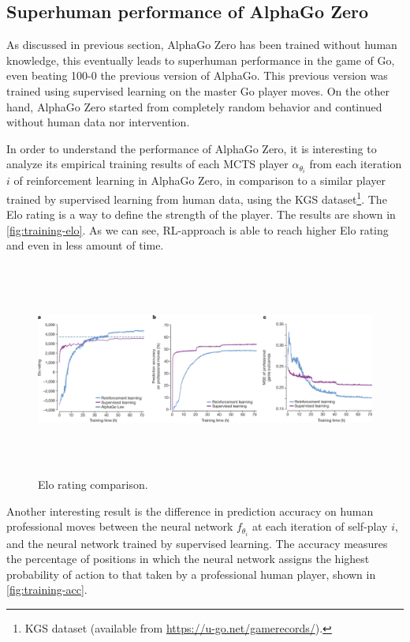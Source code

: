 \documentclass{article}
\begin{document}
\subsection{Superhuman performance of AlphaGo Zero}
As discussed in previous section, AlphaGo Zero has been trained without human knowledge, this eventually leads to superhuman performance in the game of Go, even beating 100-0 the previous version of AlphaGo. This previous version was trained using supervised learning on the master Go player moves. On the other hand, AlphaGo Zero started from completely random behavior and continued without human data nor intervention.

In order to understand the performance of AlphaGo Zero, it is interesting to analyze its empirical training results of each MCTS player $\alpha_{\theta_i}$ from each iteration $i$ of reinforcement learning in AlphaGo Zero, in comparison to a similar player trained by supervised learning from human data, using the KGS dataset\footnote{KGS dataset (available from \url{https://u-go.net/gamerecords/}).}. The Elo rating is a way to define the strength of the player. The results are shown in  \autoref{fig:training-elo}. As we can see, RL-approach is able to reach higher Elo rating and even in less amount of time.

\begin{figure}[H]
	\centering
	\includegraphics[height=7cm,trim={0px 0px 1425px 45px},clip]{alpha-go-zero_empirical_results.png}
	\caption{Elo rating comparison. \cite{Silver_2016}}
	\label{fig:training-elo}
\end{figure}

Another interesting result is the difference in prediction accuracy on human professional moves between the neural network $f_{\theta_i}$ at each iteration of self-play $i$, and the neural network trained by supervised learning. The accuracy measures the percentage of positions in which the neural network assigns the highest probability of action to that taken by a professional human player, shown in \autoref{fig:training-acc}.
\end{document}
